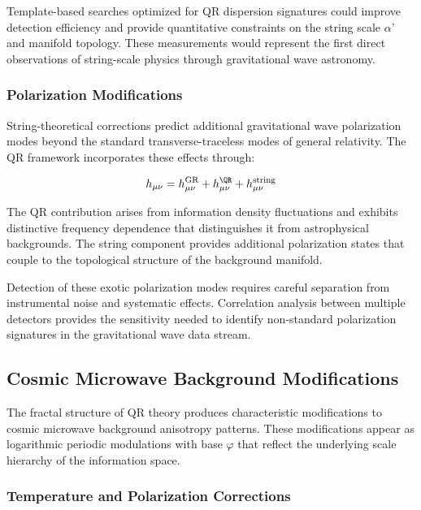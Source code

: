 Template-based searches optimized for QR dispersion signatures could improve detection efficiency and provide quantitative constraints on the string scale $\alpha’$ and manifold topology. These measurements would represent the first direct observations of string-scale physics through gravitational wave astronomy.

\subsubsection{Polarization Modifications}
\label{subsubsec:polarization-modifications}

String-theoretical corrections predict additional gravitational wave polarization modes beyond the standard transverse-traceless modes of general relativity. The QR framework incorporates these effects through:

\begin{equation}
h_{\mu\nu} = h_{\mu\nu}^{\text{GR}} + h_{\mu\nu}^{\QR} + h_{\mu\nu}^{\text{string}}
\label{eq:polarization-decomposition-detailed}
\end{equation}

The QR contribution arises from information density fluctuations and exhibits distinctive frequency dependence that distinguishes it from astrophysical backgrounds. The string component provides additional polarization states that couple to the topological structure of the background manifold.

Detection of these exotic polarization modes requires careful separation from instrumental noise and systematic effects. Correlation analysis between multiple detectors provides the sensitivity needed to identify non-standard polarization signatures in the gravitational wave data stream.

\subsection{Cosmic Microwave Background Modifications}
\label{subsec:cmb-modifications}

The fractal structure of QR theory produces characteristic modifications to cosmic microwave background anisotropy patterns. These modifications appear as logarithmic periodic modulations with base $\varphi$ that reflect the underlying scale hierarchy of the information space.

\subsubsection{Temperature and Polarization Corrections}
\label{subsubsec:temperature-polarization}

